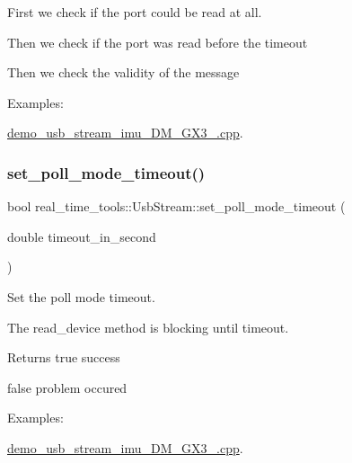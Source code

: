 \begin{DoxyItemize}
\item First we check if the port could be read at all.
\item Then we check if the port was read before the timeout
\item Then we check the validity of the message
\end{DoxyItemize}\begin{Desc}
\item[Examples\+: ]\par
\hyperlink{demo_usb_stream_imu_3DM_GX3_25_8cpp-example}{demo\+\_\+usb\+\_\+stream\+\_\+imu\+\_\+D\+M\+\_\+\+G\+X3\+\_.\+cpp}.\end{Desc}
\mbox{\label{classreal__time__tools_1_1UsbStream_a1c61741541acfca7ecf6deaf0b8ad1fc}} 
\subsubsection{\texorpdfstring{set\+\_\+poll\+\_\+mode\+\_\+timeout()}{set\_poll\_mode\_timeout()}}
{\footnotesize\ttfamily bool real\+\_\+time\+\_\+tools\+::\+Usb\+Stream\+::set\+\_\+poll\+\_\+mode\+\_\+timeout (\begin{DoxyParamCaption}\item[{double}]{timeout\+\_\+in\+\_\+second }\end{DoxyParamCaption})}



Set the poll mode timeout. 

The read\+\_\+device method is blocking until timeout.

\begin{DoxyReturn}{Returns}
true success 

false problem occured 
\end{DoxyReturn}
\begin{Desc}
\item[Examples\+: ]\par
\hyperlink{demo_usb_stream_imu_3DM_GX3_25_8cpp-example}{demo\+\_\+usb\+\_\+stream\+\_\+imu\+\_\+D\+M\+\_\+\+G\+X3\+\_.\+cpp}.\end{Desc}
\mbox{\label{classreal__time__tools_1_1UsbStream_adb0c41dc7a9603022a0a1e19c9ab8292}} 
